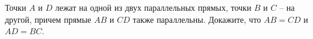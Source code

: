 \begin{ex}
	\begin{condition}
		Точки \( A  \) и \( D  \) лежат на одной из двух параллельных прямых, точки \( B \) и \( C \) – на другой, причем прямые \( AB  \) и \( CD \) также параллельны. Докажите, что \( AB = CD  \) и \( AD = BC \).
	\end{condition}
\end{ex}